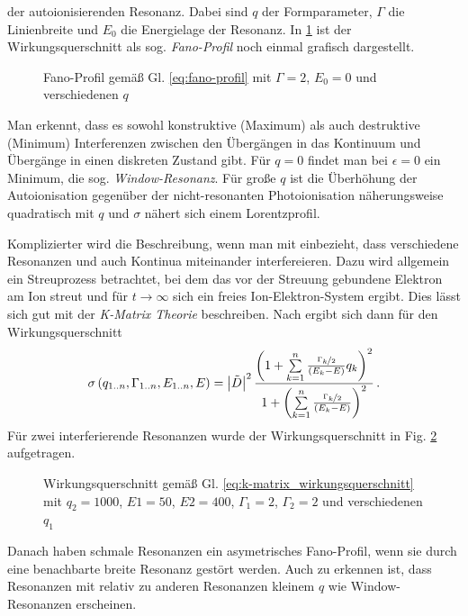 der autoionisierenden Resonanz. Dabei sind $q$ der Formparameter, $\Gamma$ die
Linienbreite und $E_0$ die Energielage der Resonanz. In \ref{fig:fano} ist der
Wirkungsquerschnitt als sog. \textit{Fano-Profil} noch einmal grafisch
dargestellt.
\begin{figure}
	\centering
	
	\caption{Fano-Profil gemäß Gl. \eqref{eq:fano-profil} mit
	$\Gamma=2$, $E_0=0$ und verschiedenen $q$}\label{fig:fano}
\end{figure}
Man erkennt, dass es sowohl konstruktive (Maximum) als auch destruktive
(Minimum) Interferenzen zwischen den Übergängen in das Kontinuum und Übergänge
in einen diskreten Zustand gibt. Für $q=0$ findet man bei $\epsilon=0$ ein
Minimum, die sog. \textit{Window-Resonanz}. Für große $q$ ist die Überhöhung der
Autoionisation gegenüber der nicht-resonanten Photoionisation näherungsweise
quadratisch mit $q$ und $\sigma$ nähert sich einem Lorentzprofil.\par
Komplizierter wird die Beschreibung, wenn man mit einbezieht, dass verschiedene
Resonanzen und auch Kontinua miteinander interfereieren. Dazu wird allgemein ein
Streuprozess betrachtet, bei dem das vor der Streuung gebundene Elektron am
Ion streut und für $t\to\infty$ sich ein freies Ion-Elektron-System ergibt. Dies
lässt sich gut mit der \textit{K-Matrix Theorie} beschreiben. Nach
\cite{connerade:1998:highly_excited_atoms} ergibt sich dann für den
Wirkungsquerschnitt
\begin{equation}\label{eq:k-matrix_wirkungsquerschnitt}
	\sigma\left(q_{1..n},\Gamma_{1..n},E_{1..n},E\right)=\left|\tilde{D}\right|^2\frac{\left(1+\sum\limits_{k=1}^n{\frac{\nicefrac{\Gamma_k}{2}}{\left(E_k-E\right)}q_k}\right)^2}{1+\left(\sum\limits_{k=1}^n{\frac{\nicefrac{\Gamma_k}{2}}{\left(E_k-E\right)}}\right)^2}\,.
\end{equation}
Für zwei interferierende Resonanzen wurde der Wirkungsquerschnitt in Fig.
\ref{fig:k-matrix_wirkungsquerschnitt} aufgetragen.
\begin{figure}
	\centering
	
	\caption{Wirkungsquerschnitt gemäß Gl. \eqref{eq:k-matrix_wirkungsquerschnitt}
	mit $q_2=1000$, $E1=50$, $E2=400$, $\Gamma_1=2$, $\Gamma_2=2$ und
	verschiedenen $q_1$}\label{fig:k-matrix_wirkungsquerschnitt}
\end{figure}
Danach haben schmale Resonanzen ein asymetrisches Fano-Profil, wenn sie durch
eine benachbarte breite Resonanz gestört werden. Auch zu erkennen ist, dass
Resonanzen mit relativ zu anderen Resonanzen kleinem $q$ wie Window-Resonanzen
erscheinen.

